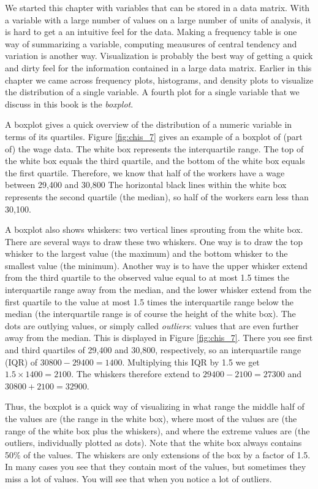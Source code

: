 \documentclass[]{book}\usepackage[]{graphicx}\usepackage[]{color}
\begin{document}
We started this chapter with variables that can be stored in a data matrix. With a variable with a large number of values on a large number of units of analysis, it is hard to get a an intuitive feel for the data. Making a frequency table is one way of summarizing a variable, computing meausures of central tendency and variation is another way. Visualization is probably the best way of getting a quick and dirty feel for the information contained in a large data matrix. Earlier in this chapter we came across frequency plots, histograms, and density plots to visualize the distribution of a single variable. A fourth plot for a single variable that we discuss in this book is the \textit{boxplot}.  

A boxplot gives a quick overview of the distribution of a numeric variable in terms of its quartiles. Figure \ref{fig:chis_7} gives an example of a boxplot of (part of) the wage data. The white box represents the interquartile range. The top of the white box equals the third quartile, and the bottom of the white box equals the first quartile. Therefore, we know that half of the workers have a wage between 29,400 and 30,800 The horizontal black lines within the white box represents the second quartile (the median), so half of the workers earn less than 30,100. 

A boxplot also shows whiskers: two vertical lines sprouting from the white box. There are several ways to draw these two whiskers. One way is to draw the top whisker to the largest value (the maximum) and the bottom whisker to the smallest value (the minimum). Another way is to have the upper whisker extend from the third quartile to the observed value equal to at most 1.5 times the interquartile range away from the median, and the lower whisker extend from the first quartile to the value at most 1.5 times the interquartile range below the median (the interquartile range is of course the height of the white box). The dots are outlying values, or simply called \textit{outliers}: values that are even further away from the median. This is displayed in Figure \ref{fig:chis_7}. There you see first and third quartiles of 29,400 and 30,800, respectively, so an interquartile range (IQR) of $30800-29400=1400$. Multiplying this IQR by 1.5 we get $1.5 \times 1400= 2100$. The whiskers therefore extend to $29400-2100=27300$ and $30800+2100=32900$. 

Thus, the boxplot is a quick way of visualizing in what range the middle half of the values are (the range in the white box), where most of the values are (the range of the white box plus the whiskers), and where the extreme values are (the outliers, individually plotted as dots). Note that the white box always contains 50\% of the values. The whiskers are only extensions of the box by a factor of 1.5. In many cases you see that they contain most of the values, but sometimes they miss a lot of values. You will see that when you notice a lot of outliers.
\end{document}
